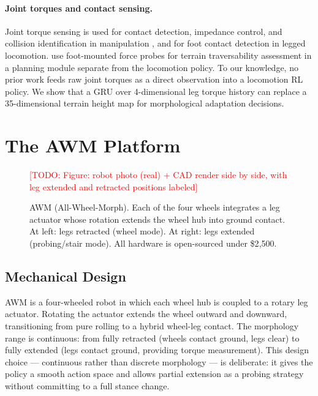 \documentclass{article}
\newcommand{\todo}[1]{\textcolor{red}{[TODO: #1]}}
\begin{document}
\paragraph{Joint torques and contact sensing.}
Joint torque sensing is used for contact detection, impedance control, and collision
identification in manipulation \citep{haddadin2017robot}, and for foot contact detection
in legged locomotion. \citet{higuera2022traversability} use foot-mounted force probes for
terrain traversability assessment in a planning module separate from the locomotion policy.
To our knowledge, no prior work feeds raw joint torques as a direct observation into
a locomotion RL policy. We show that a GRU over 4-dimensional leg torque history can
replace a 35-dimensional terrain height map for morphological adaptation decisions.


\section{The AWM Platform}
\label{sec:platform}

\begin{figure}[t]
    \centering
    \todo{Figure: robot photo (real) + CAD render side by side, with leg extended and
    retracted positions labeled}
    \caption{AWM (All-Wheel-Morph). Each of the four wheels integrates a leg actuator
    whose rotation extends the wheel hub into ground contact. At left: legs retracted
    (wheel mode). At right: legs extended (probing/stair mode). All hardware is
    open-sourced under \$2{,}500.}
    \label{fig:robot}
\end{figure}

\subsection{Mechanical Design}

AWM is a four-wheeled robot in which each wheel hub is coupled to a rotary leg actuator.
Rotating the actuator extends the wheel outward and downward, transitioning from pure
rolling to a hybrid wheel-leg contact. The morphology range is continuous: from fully
retracted (wheels contact ground, legs clear) to fully extended (legs contact ground,
providing torque measurement). This design choice --- continuous rather than discrete
morphology --- is deliberate: it gives the policy a smooth action space and allows
partial extension as a probing strategy without committing to a full stance change.
\end{document}
